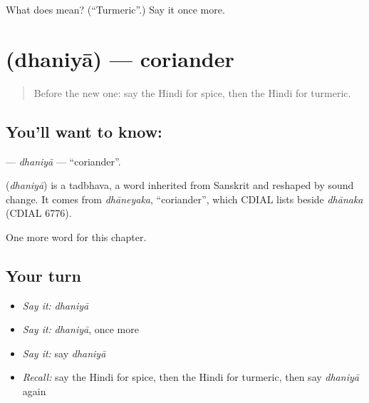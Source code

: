 \begin{tcolorbox}[breakable,colback=teal!4,colframe=teal!35!black,title={Before you move on}]
What does  mean? (\textquotedblleft{}Turmeric\textquotedblright{}.) Say it once more.
\end{tcolorbox}
\section[\texorpdfstring{\hi{धनिया} (dhaniyā)}{धनिया (dhaniyā)}]{ (dhaniyā) — coriander}

\label{lesson:HI-C211-dhaniya}



\begin{quote}
Before the new one: say the Hindi for spice, then the Hindi for turmeric.
\end{quote}

\subsection*{You'll want to know: }
\textbf{} — \emph{dhaniyā} — \textquotedblleft{}coriander\textquotedblright{}.

\begin{cousinweb}
\textbf{} (\emph{dhaniyā}) is a tadbhava, a word inherited from Sanskrit and reshaped by sound change. It comes from \emph{dhāneyaka}, \textquotedblleft{}coriander\textquotedblright{}, which CDIAL lists beside \emph{dhānaka} (CDIAL 6776).
\end{cousinweb}

\begin{grammarlens}[title={What you've built}]
One more word for this chapter.
\end{grammarlens}

\subsection*{Your turn}
\begin{itemize}
\raggedright
  \item \emph{Say it:} \emph{dhaniyā}
  \item \emph{Say it:} \emph{dhaniyā}, once more
  \item \emph{Say it:} say \emph{dhaniyā}
  \item \emph{Recall:} say the Hindi for spice, then the Hindi for turmeric, then say \emph{dhaniyā} again
\end{itemize}

